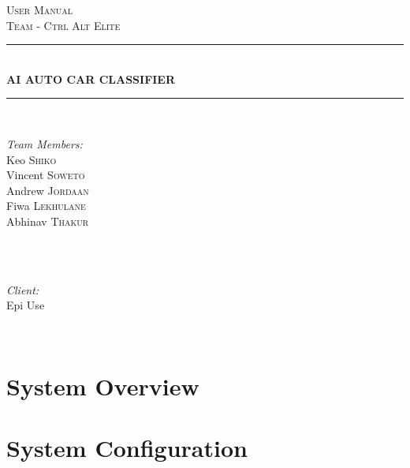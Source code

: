 \documentclass[11pt]{article}
\begin{document}
		\begin{titlepage}
			
			\newcommand{\HRule}{\rule{\linewidth}{0.5mm}} 
			
			\center 
			
			\textsc{\LARGE User Manual}\\[0.5cm] 
			\textsc{\Large Team - Ctrl Alt Elite}\\[0.5cm] 
			
			\HRule \\[0.4cm]
			{ \huge \bfseries AI AUTO CAR CLASSIFIER}\\[0.4cm] 
			\HRule \\[1.5cm]
			
			\begin{minipage}{0.4\textwidth}
				\begin{flushleft} \large
					\emph{Team Members:}\\
					Keo \textsc{Shiko}\\
					Vincent \textsc{Soweto}\\
					Andrew \textsc{Jordaan}\\
					Fiwa \textsc{Lekhulane}\\
					Abhinav \textsc{Thakur}\\
				\end{flushleft}
			\end{minipage}
			\\
			\\
			\begin{minipage}{0.4\textwidth}
				\begin{flushright} \large
					\emph{Client:} \\
					Epi Use 
				\end{flushright}
			\end{minipage}\\[2cm]
			
			
			
		\end{titlepage}
	
		\newpage
		\tableofcontents
	
	
	\newpage
	
	\section{System Overview}

	
	\section{System Configuration}
\end{document}
